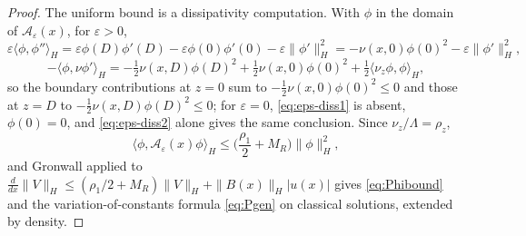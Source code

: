 \documentclass[10pt,a4paper]{amsart}
\newcommand{\Hs}{H}
\begin{document}
\begin{proof}
The uniform bound is a dissipativity computation. With $\phi$ in the domain of $\mathcal A_\varepsilon(x)$, for $\varepsilon>0$,
\begin{equation}
 \varepsilon\langle\phi,\phi''\rangle_\Hs
 =\varepsilon\phi(D)\phi'(D)-\varepsilon\phi(0)\phi'(0)-\varepsilon\|\phi'\|_\Hs^2
 =-\nu(x,0)\phi(0)^2-\varepsilon\|\phi'\|_\Hs^2,
 \label{eq:eps-diss1}
\end{equation}
\begin{equation}
 -\langle\phi,\nu\phi'\rangle_\Hs
 =-\tfrac12\nu(x,D)\phi(D)^2+\tfrac12\nu(x,0)\phi(0)^2
 +\tfrac12\langle\nu_z\phi,\phi\rangle_\Hs,
 \label{eq:eps-diss2}
\end{equation}
so the boundary contributions at $z=0$ sum to $-\tfrac12\nu(x,0)\phi(0)^2\le0$ and those at $z=D$ to $-\tfrac12\nu(x,D)\phi(D)^2\le0$; for $\varepsilon=0$, \eqref{eq:eps-diss1} is absent, $\phi(0)=0$, and \eqref{eq:eps-diss2} alone gives the same conclusion. Since $\nu_z/\Lambda=\rho_z$,
\begin{equation}
 \langle\phi,\mathcal A_\varepsilon(x)\phi\rangle_\Hs
 \le\Big(\frac{\rho_1}{2}+M_R\Big)\|\phi\|_\Hs^2,
 \label{eq:eps-diss3}
\end{equation}
and Gronwall applied to $\frac{d}{dx}\|V\|_\Hs\le(\rho_1/2+M_R)\|V\|_\Hs+\|B(x)\|_\Hs|u(x)|$ gives \eqref{eq:Phibound} and the variation-of-constants formula \eqref{eq:Pgen} on classical solutions, extended by density.


\end{proof}
\end{document}
